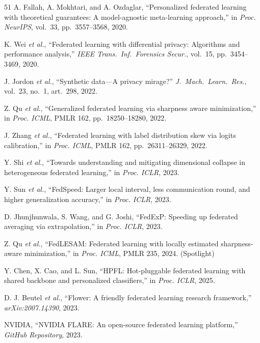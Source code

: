 \documentclass[conference,a4paper]{IEEEtran}
\begin{document}
\begin{thebibliography}{51}
A. Fallah, A. Mokhtari, and A. Ozdaglar, ``Personalized federated learning with theoretical guarantees: A model-agnostic meta-learning approach,'' in \textit{Proc. NeurIPS}, vol.~33, pp.~3557--3568, 2020.

K. Wei \textit{et al.}, ``Federated learning with differential privacy: Algorithms and performance analysis,'' \textit{IEEE Trans.~Inf.~Forensics Secur.}, vol.~15, pp.~3454--3469, 2020.

J. Jordon \textit{et al.}, ``Synthetic data---A privacy mirage?'' \textit{J.~Mach.~Learn.~Res.}, vol.~23, no.~1, art.~298, 2022.

Z. Qu \textit{et al.}, ``Generalized federated learning via sharpness aware minimization,'' in \textit{Proc. ICML}, PMLR 162, pp.~18250--18280, 2022.

J. Zhang \textit{et al.}, ``Federated learning with label distribution skew via logits calibration,'' in \textit{Proc. ICML}, PMLR 162, pp.~26311--26329, 2022.

Y. Shi \textit{et al.}, ``Towards understanding and mitigating dimensional collapse in heterogeneous federated learning,'' in \textit{Proc. ICLR}, 2023.

Y. Sun \textit{et al.}, ``FedSpeed: Larger local interval, less communication round, and higher generalization accuracy,'' in \textit{Proc. ICLR}, 2023.

D. Jhunjhunwala, S. Wang, and G. Joshi, ``FedExP: Speeding up federated averaging via extrapolation,'' in \textit{Proc. ICLR}, 2023.

Z. Qu \textit{et al.}, ``FedLESAM: Federated learning with locally estimated sharpness-aware minimization,'' in \textit{Proc. ICML}, PMLR 235, 2024. (Spotlight)

Y. Chen, X. Cao, and L. Sun, ``HPFL: Hot-pluggable federated learning with shared backbone and personalized classifiers,'' in \textit{Proc. ICLR}, 2025.

D. J. Beutel \textit{et al.}, ``Flower: A friendly federated learning research framework,'' \textit{arXiv:2007.14390}, 2023.

NVIDIA, ``NVIDIA FLARE: An open-source federated learning platform,'' \textit{GitHub Repository}, 2023.


\end{thebibliography}
\end{document}

